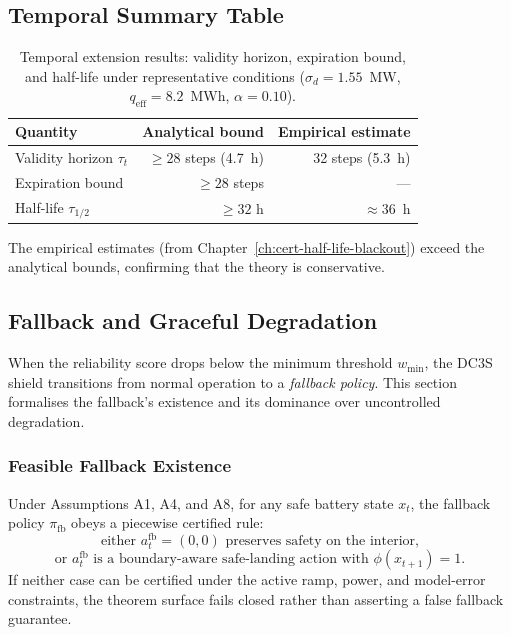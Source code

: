 \subsection{Temporal Summary Table}

\begin{table}[ht]
\centering
\caption{Temporal extension results: validity horizon, expiration bound,
  and half-life under representative conditions
  ($\sigma_d = 1.55$~MW, $q_{\text{eff}} = 8.2$~MWh, $\alpha = 0.10$).}
\label{tab:temporal-summary}
\begin{tabular}{lrr}
\toprule
\textbf{Quantity} & \textbf{Analytical bound} & \textbf{Empirical estimate} \\
\midrule
Validity horizon $\tau_t$ & $\ge 28$ steps (4.7~h) & 32 steps (5.3~h) \\
Expiration bound & $\ge 28$ steps & --- \\
Half-life $\tau_{1/2}$ & $\ge 32$ h & $\approx 36$~h \\
\bottomrule
\end{tabular}
\end{table}

The empirical estimates (from Chapter~\ref{ch:cert-half-life-blackout})
exceed the analytical bounds, confirming that the theory is conservative.


\subsection{Fallback and Graceful Degradation}

When the reliability score drops below the minimum threshold
$w_{\min}$, the DC3S shield transitions from normal operation to
a \emph{fallback policy}.  This section formalises the fallback's
existence and its dominance over uncontrolled degradation.

\subsubsection{Feasible Fallback Existence}

\begin{theorem}
\label{thm:fallback-existence}
Under Assumptions A1, A4, and A8, for any safe battery state $x_t$, the
fallback policy $\pi_{\text{fb}}$ obeys a piecewise certified rule:
\[
  \text{either } a_t^{\text{fb}} = (0,0) \text{ preserves safety on the interior,}
\]
\[
  \text{or } a_t^{\text{fb}} \text{ is a boundary-aware safe-landing action with }
  \phi(x_{t+1}) = 1.
\]
If neither case can be certified under the active ramp, power, and model-error
constraints, the theorem surface fails closed rather than asserting a false
fallback guarantee.
\end{theorem}

